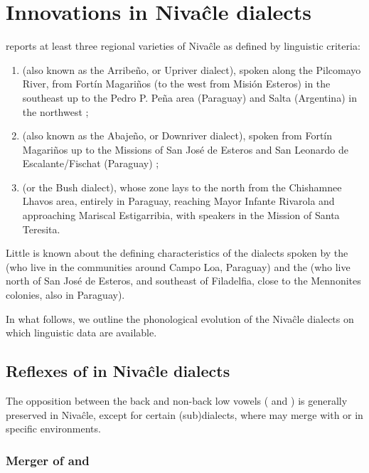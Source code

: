 \section{Innovations in Nivaĉle dialects}\label{ni-dialects}

\citet[7]{AnG15} reports at least three regional varieties of Nivaĉle as defined by linguistic criteria:
\begin{enumerate}
    \item {} (also known as the Arribeño, or Upriver dialect), spoken along the Pilcomayo River, from Fortín Magariños (to the west from Misión Esteros) in the southeast up to the Pedro P. Peña area (Paraguay) and Salta (Argentina) in the northwest \citep[21--22]{NS87};
    \item {} (also known as the Abajeño, or Downriver dialect), spoken from Fortín Magariños up to the Missions of San José de Esteros and San Leonardo de Escalante/Fischat (Paraguay) \citep[21--22]{NS87};
    \item {} (or the Bush dialect), whose zone lays to the north from the Chishamnee Lhavos area, entirely in Paraguay, reaching Mayor Infante Rivarola and approaching Mariscal Estigarribia, with speakers in the Mission of Santa Teresita.
\end{enumerate}

Little is known about the defining characteristics of the dialects spoken by the  (who live in the communities around Campo Loa, Paraguay) and the  (who live north of San José de Esteros, and southeast of Filadelfia, close to the Mennonites colonies, also in Paraguay).

In what follows, we outline the phonological evolution of the Nivaĉle dialects on which linguistic data are available.

\subsection{Reflexes of  in Nivaĉle dialects}

The opposition between the back and non-back low vowels ( and ) is generally preserved in Nivaĉle, except for certain (sub)dialects, where  may merge with  or  in specific environments.

\subsubsection{Merger of  and }\label{ni-a-ao-merger}

